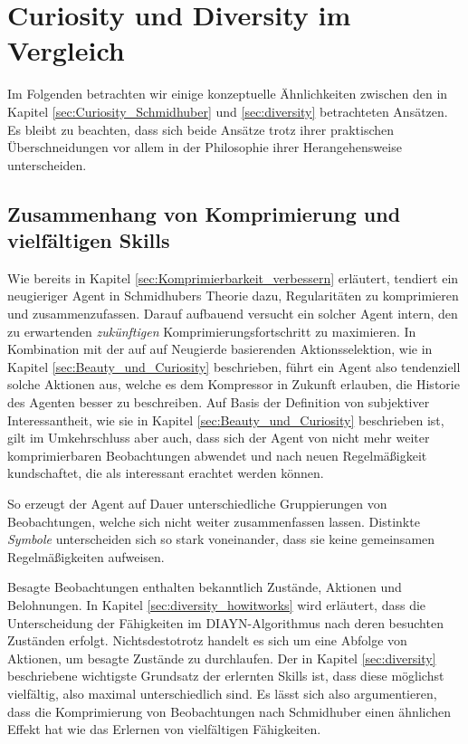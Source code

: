 \section{Curiosity und Diversity im Vergleich}
\label{sec:comparison}
Im Folgenden betrachten wir einige konzeptuelle Ähnlichkeiten zwischen den in Kapitel \ref{sec:Curiosity_Schmidhuber} und \ref{sec:diversity} betrachteten Ansätzen.
Es bleibt zu beachten, dass sich beide Ansätze trotz ihrer praktischen Überschneidungen vor allem in der Philosophie ihrer Herangehensweise unterscheiden.

\subsection{Zusammenhang von Komprimierung und vielfältigen Skills}
\label{sec:comparison_theory}

Wie bereits in Kapitel \ref{sec:Komprimierbarkeit_verbessern} erläutert, tendiert ein neugieriger Agent in Schmidhubers Theorie dazu, Regularitäten zu komprimieren und zusammenzufassen. Darauf aufbauend versucht ein solcher Agent intern, den zu erwartenden \emph{zukünftigen} Komprimierungsfortschritt zu maximieren. 
In Kombination mit der auf auf Neugierde basierenden Aktionsselektion, wie in Kapitel \ref{sec:Beauty_und_Curiosity} beschrieben, führt ein Agent also tendenziell solche Aktionen aus, welche es dem Kompressor in Zukunft erlauben, die Historie des Agenten besser zu beschreiben. 
Auf Basis der Definition von subjektiver Interessantheit, wie sie in Kapitel \ref{sec:Beauty_und_Curiosity} beschrieben ist, gilt im Umkehrschluss aber auch, dass sich der Agent von nicht mehr weiter komprimierbaren Beobachtungen abwendet und nach neuen Regelmäßigkeit kundschaftet, die als interessant erachtet werden können.

So erzeugt der Agent auf Dauer unterschiedliche Gruppierungen von Beobachtungen, welche sich nicht weiter zusammenfassen lassen. Distinkte \emph{Symbole} unterscheiden sich so stark voneinander, dass sie keine gemeinsamen Regelmäßigkeiten aufweisen.

Besagte Beobachtungen enthalten bekanntlich Zustände, Aktionen und Belohnungen. In Kapitel \ref{sec:diversity_howitworks} wird erläutert, dass die Unterscheidung der Fähigkeiten im DIAYN-Algorithmus nach deren besuchten Zuständen erfolgt. Nichtsdestotrotz handelt es sich um eine Abfolge von Aktionen, um besagte Zustände zu durchlaufen. Der in Kapitel \ref{sec:diversity} beschriebene wichtigste Grundsatz der erlernten Skills ist, dass diese möglichst vielfältig, also maximal unterschiedlich sind. Es lässt sich also argumentieren, dass die Komprimierung von Beobachtungen nach Schmidhuber einen ähnlichen Effekt hat wie das Erlernen von vielfältigen Fähigkeiten.

